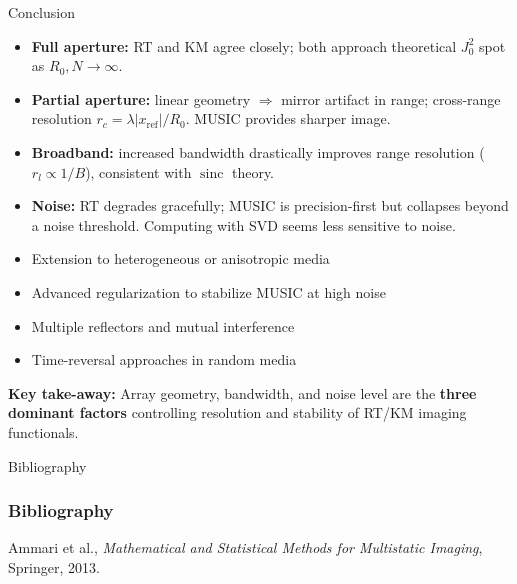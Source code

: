 \documentclass{beamer}
\begin{document}
\begin{frame}{Conclusion}
  \scriptsize
  \vspace{-0.1cm}
  \begin{tcolorbox}[keybox, title=Summary of Findings, top=2pt, bottom=2pt]
    \begin{itemize}[leftmargin=0.5em, label=\textbullet]\setlength\itemsep{1.5pt}
      \item \textbf{Full aperture:} RT and KM agree closely; both approach theoretical $J_0^2$ spot as $R_0,N\!\to\!\infty$.
      \item \textbf{Partial aperture:} linear geometry $\Rightarrow$ mirror artifact in range; cross-range resolution $r_c\!=\!\lambda|x_{\mathrm{ref}}|/R_0$. MUSIC provides sharper image.
      \item \textbf{Broadband:} increased bandwidth drastically improves range resolution ($r_l \!\propto\! 1/B$), consistent with $\operatorname{sinc}$ theory.
      \item \textbf{Noise:} RT degrades gracefully; MUSIC is precision-first but collapses beyond a noise threshold. Computing with SVD seems less sensitive to noise.
    \end{itemize}
  \end{tcolorbox}


  \begin{tcolorbox}[warnbox, title=Perspectives, top=2pt, bottom=2pt]
    \begin{itemize}[leftmargin=0.5em, label=\textbullet]\setlength\itemsep{1.5pt}
      \item Extension to heterogeneous or anisotropic media
      \item Advanced regularization to stabilize MUSIC at high noise
      \item Multiple reflectors and mutual interference
      \item Time-reversal approaches in random media
    \end{itemize}
  \end{tcolorbox}


  \begin{tcolorbox}[keybox, top=2pt, bottom=2pt]
    \textbf{Key take-away:} Array geometry, bandwidth, and noise level are the \textbf{three dominant factors} controlling resolution and stability of RT/KM imaging functionals.
  \end{tcolorbox}
\end{frame}


\begingroup
{}

\begin{frame}[allowframebreaks]{Bibliography}
\frametitle{Bibliography}
Ammari et al., \textit{Mathematical and Statistical Methods for Multistatic Imaging}, Springer, 2013.
\end{frame}
\endgroup
\end{document}
